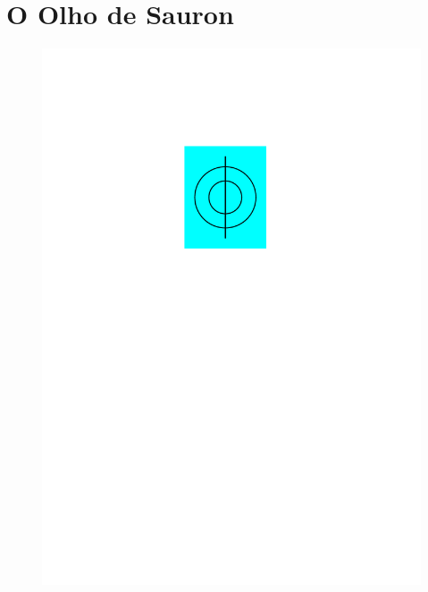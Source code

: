 \documentclass[12pt, a4paper]{article}
\begin{document}
	\section{O Olho de Sauron}
	\begin{figure}[H]
		\centering
		\includegraphics[width=0.3\linewidth]{sauron_s_eye/eye}
		\label{fig:eye}
	\end{figure}
\end{document}
